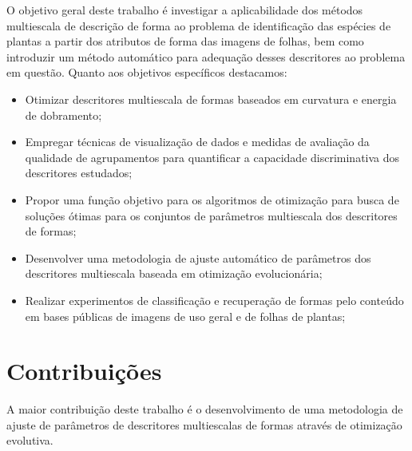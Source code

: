 

O objetivo geral deste trabalho é investigar a aplicabilidade dos métodos multiescala de descrição de forma ao problema de identificação das espécies de plantas a partir dos atributos de forma das imagens de folhas, bem como introduzir um método automático para adequação desses descritores ao problema em questão. Quanto aos objetivos específicos destacamos:

\begin{itemize}
\item Otimizar descritores multiescala de formas baseados em curvatura e energia de dobramento;

\item Empregar técnicas de visualização de dados e medidas de avaliação da qualidade de agrupamentos para quantificar a capacidade discriminativa dos descritores estudados; 

\item Propor uma função objetivo para os algoritmos de otimização para busca de soluções ótimas para os conjuntos de parâmetros multiescala dos descritores de formas;

\item Desenvolver uma metodologia de ajuste automático de parâmetros dos descritores multiescala baseada em otimização evolucionária;

\item Realizar experimentos de classificação e recuperação de formas pelo conteúdo em bases públicas de imagens de uso geral e de folhas de plantas;

\end{itemize}


\section{Contribuições \label{sec:contrib}}

A maior contribuição deste trabalho é o desenvolvimento de uma metodologia de ajuste de parâmetros de descritores multiescalas de formas através de otimização evolutiva.


